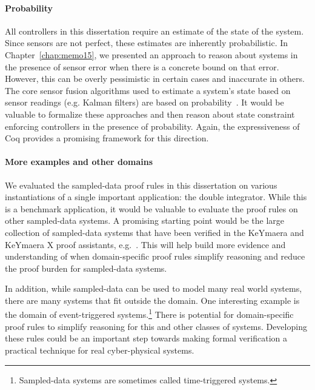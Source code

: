 \paragraph{Probability}
All controllers in this dissertation require an estimate of the state of
the system. Since sensors are not perfect, these estimates are inherently
probabilistic. In Chapter~\ref{chap:memo15}, we presented an approach to
reason about systems in the presence of sensor error when there is a
concrete bound on that error. However, this can be overly pessimistic in
certain cases and inaccurate in others. The core sensor fusion algorithms
used to estimate a system's state based on sensor readings (e.g. Kalman
filters) are based on probability~\cite{Simon06estimation}. It would be
valuable to formalize these approaches and then reason about state
constraint enforcing controllers in the presence of probability. Again, the
expressiveness of Coq provides a promising framework for this direction.

\paragraph{More examples and other domains}
We evaluated the sampled-data proof rules in this dissertation on various
instantiations of a single important application: the double
integrator. While this is a benchmark application, it would be valuable to
evaluate the proof rules on other sampled-data systems. A promising
starting point would be the large collection of sampled-data systems that
have been verified in the KeYmaera and KeYmaera X proof assistants,
e.g.~\cite{platzercruise11,platzerrobots13}. This will help build more
evidence and understanding of when domain-specific proof rules simplify
reasoning and reduce the proof burden for sampled-data systems.

In addition, while sampled-data can be used to model many real world
systems, there are many systems that fit outside the domain. One
interesting example is the domain of event-triggered
systems.\footnote{Sampled-data systems are sometimes called time-triggered
  systems.} There is potential for domain-specific proof rules to simplify
reasoning for this and other classes of systems. Developing these rules
could be an important step towards making formal verification a practical
technique for real cyber-physical systems.
